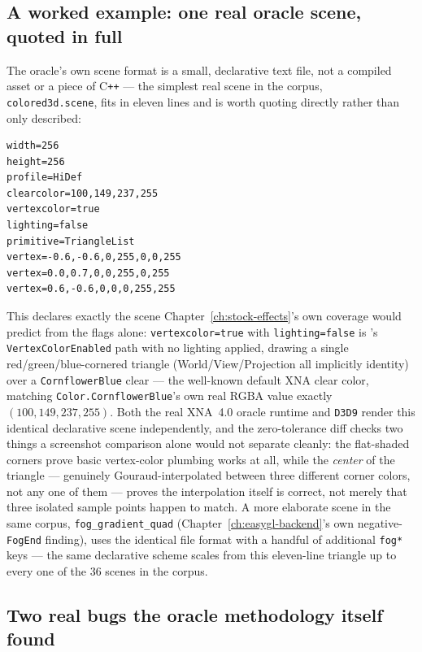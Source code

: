 \subsection{A worked example: one real oracle scene, quoted in full}

The oracle's own scene format is a small, declarative text file, not a compiled asset or a
piece of C\texttt{++} --- the simplest real scene in the corpus, \texttt{colored3d.scene},
fits in eleven lines and is worth quoting directly rather than only described:

\begin{lstlisting}
width=256
height=256
profile=HiDef
clearcolor=100,149,237,255
vertexcolor=true
lighting=false
primitive=TriangleList
vertex=-0.6,-0.6,0,255,0,0,255
vertex=0.0,0.7,0,0,255,0,255
vertex=0.6,-0.6,0,0,0,255,255
\end{lstlisting}

This declares exactly the scene Chapter~\ref{ch:stock-effects}'s own 
coverage would predict from the flags alone: \texttt{vertexcolor=true} with
\texttt{lighting=false} is 's \texttt{VertexColorEnabled} path with no
lighting applied, drawing a single red/green/blue-cornered triangle (World/View/Projection all
implicitly identity) over a \texttt{CornflowerBlue} clear --- the well-known default XNA clear
color, matching \texttt{Color.CornflowerBlue}'s own real RGBA value exactly
$(100, 149, 237, 255)$. Both the real XNA~4.0 oracle runtime and \texttt{D3D9} render this
identical declarative scene independently, and the zero-tolerance diff checks two things a
screenshot comparison alone would not separate cleanly: the flat-shaded corners prove basic
vertex-color plumbing works at all, while the \emph{center} of the triangle --- genuinely
Gouraud-interpolated between three different corner colors, not any one of them --- proves the
interpolation itself is correct, not merely that three isolated sample points happen to match.
A more elaborate scene in the same corpus, \texttt{fog\_gradient\_quad}
(Chapter~\ref{ch:easygl-backend}'s own negative-\texttt{FogEnd} finding), uses the identical
file format with a handful of additional \texttt{fog*} keys --- the same declarative scheme
scales from this eleven-line triangle up to every one of the 36 scenes in the corpus.

\subsection{Two real bugs the oracle methodology itself found}

